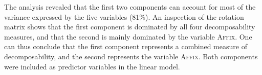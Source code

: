 \begin{table}
	\caption{ Summary of principal components}
	\label{tbl: summary PC in corpus}
	
	

\vspace*{-0.4cm}
\end{table}



The analysis revealed that the first two components can account for most of the variance expressed by the five variables (81\%). An inspection of the rotation matrix shows that the first component is dominated by all four decomposability measures, and that the second is mainly dominated by the variable \textsc{Affix}. One can thus conclude that the first component represents a combined measure of decomposability, and the second represents the variable \textsc{Affix}. 
Both components were included as predictor variables in the linear model.  



